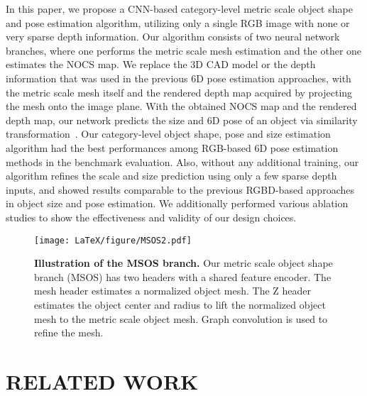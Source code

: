 \documentclass[letterpaper, 10 pt, journal, twoside]{IEEEtran}
\begin{document}
In this paper, we propose a CNN-based category-level metric scale object shape and pose estimation algorithm, utilizing only a single RGB image with none or very sparse depth information.
Our algorithm consists of two neural network branches, where one performs the metric scale mesh estimation and the other one estimates the NOCS map.
We replace the 3D CAD model or the depth information that was used in the previous 6D pose estimation approaches, with the metric scale mesh itself and the rendered depth map acquired by projecting the mesh onto the image plane.
With the obtained NOCS map and the rendered depth map, our network predicts the size and 6D pose of an object via similarity transformation~\cite{umeyama1991least}.
Our category-level object shape, pose and size estimation algorithm had the best performances among RGB-based 6D pose estimation methods in the benchmark evaluation.
Also, without any additional training, our algorithm refines the scale and size prediction using only a few sparse depth inputs, and showed results comparable to the previous RGBD-based approaches in object size and pose estimation.
We additionally performed various ablation studies to show the effectiveness and validity of our design choices.






\begin{figure*}
\begin{center}
\texttt{[image: LaTeX/figure/MSOS2.pdf]}
\caption{\textbf{Illustration of the MSOS branch.} 
Our metric scale object shape branch (MSOS) has two headers with a shared feature encoder.
The mesh header estimates a normalized object mesh.
The Z header estimates the object center and radius to lift the normalized object mesh to the metric scale object mesh. Graph convolution is used to refine the mesh.
}
\label{fig:metric_object_shape_branch}
\end{center}
\vspace{-5mm}
\end{figure*}






\section{RELATED WORK}
\end{document}
